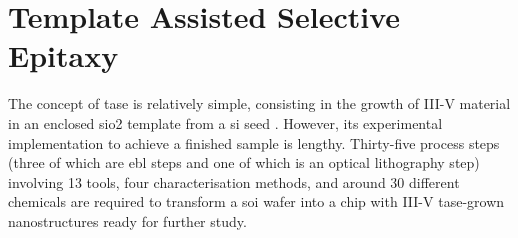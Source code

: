 \section{Template Assisted Selective Epitaxy}
\label{chap:tase}

The concept of \acf{tase} is relatively simple, consisting in the growth of III-V material in an enclosed \acf{sio2} template from a \acf{si} seed \cite{Schmid2015, borgTASEp2018}. However, its experimental implementation to achieve a finished sample is lengthy. Thirty-five process steps (three of which are \acf{ebl} steps and one of which is an optical lithography step) involving 13 tools, four characterisation methods, and around 30 different chemicals are required to transform a \acf{soi} wafer into a chip with III-V \acs{tase}-grown nanostructures ready for further study. 


